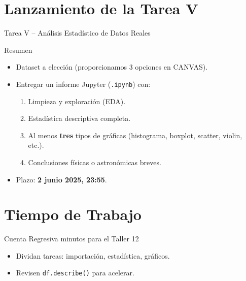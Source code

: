 \documentclass[10pt]{beamer}
\begin{document}
\section{Lanzamiento de la Tarea V}
\begin{frame}{Tarea V – Análisis Estadístico de Datos Reales}
  \begin{block}{Resumen}
    \begin{itemize}
      \item Dataset a elección (proporcionamos 3 opciones en CANVAS).
      \item Entregar un informe Jupyter (\texttt{.ipynb}) con:
        \begin{enumerate}
          \item Limpieza y exploración (EDA).
          \item Estadística descriptiva completa.
          \item Al menos \textbf{tres} tipos de gráficas (histograma, boxplot, scatter, violin, etc.).
          \item Conclusiones físicas o astronómicas breves.
        \end{enumerate}
      \item Plazo: \textbf{2 junio 2025, 23:55}.
    \end{itemize}
  \end{block}
\end{frame}

\section{Tiempo de Trabajo}
\begin{frame}{Cuenta Regresiva}
  \Huge{ minutos para el Taller 12}
  \vspace{0.4cm}
  \normalsize
  \begin{itemize}
    \item Dividan tareas: importación, estadística, gráficos.
    \item Revisen \texttt{df.describe()} para acelerar.
  \end{itemize}
\end{frame}

\end{document}
